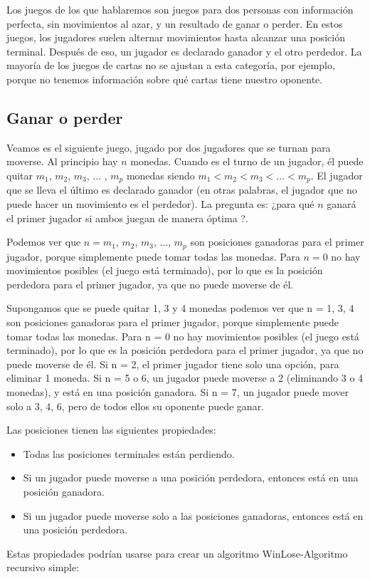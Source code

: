 Los juegos de los que hablaremos son juegos para dos personas con información perfecta, sin movimientos al azar, y un resultado de ganar o perder. En estos juegos, los jugadores suelen alternar movimientos hasta alcanzar una posición terminal. Después de eso, un jugador es declarado ganador y el otro perdedor. La mayoría de los juegos de cartas no se ajustan a esta categoría, por ejemplo, porque no tenemos información sobre qué cartas tiene nuestro oponente.

\subsection{Ganar o perder}
Veamos es el siguiente juego, jugado por dos jugadores que se turnan para moverse. Al principio hay $n$ monedas. Cuando es el turno de un jugador, él puede quitar $m_1$, $m_2$, $m_3$, $\dots$  , $m_p$ monedas siendo $m_1 < m_2 < m_3 < \dots  < m_p$. El jugador que se lleva el último es declarado ganador (en otras palabras, el jugador que no puede hacer un movimiento es el perdedor). La pregunta es: ¿para qué $n$ ganará el primer jugador si ambos juegan de manera óptima ?.

Podemos ver que $n = m_1$, $m_2$, $m_3$, $\dots$, $m_p$ son posiciones ganadoras para el primer jugador, porque simplemente puede tomar todas las monedas. Para $n = 0$ no hay movimientos posibles (el juego está terminado), por lo que es la posición perdedora para el primer jugador, ya que no puede moverse de él. 

Supongamos que se puede quitar 1, 3 y 4 monedas podemos ver que n = 1, 3, 4 son posiciones ganadoras para el primer jugador, porque simplemente puede tomar todas las monedas. Para n = 0 no hay movimientos posibles (el juego está terminado), por lo que es la posición perdedora para el primer jugador, ya que no puede moverse de él. Si n = 2, el primer jugador tiene solo una opción, para eliminar 1 moneda. Si n = 5 o 6, un jugador puede moverse a 2 (eliminando 3 o 4 monedas), y está en una posición ganadora. Si n = 7, un jugador puede mover solo a 3, 4, 6, pero de todos ellos su oponente puede ganar.

Las posiciones tienen las siguientes propiedades:
\begin{itemize}
	\item Todas las posiciones terminales están perdiendo.
	\item Si un jugador puede moverse a una posición perdedora, entonces está en una posición ganadora.
	\item Si un jugador puede moverse solo a las posiciones ganadoras, entonces está en una posición perdedora.
\end{itemize}
Estas propiedades podrían usarse para crear un algoritmo WinLose-Algoritmo recursivo simple:

